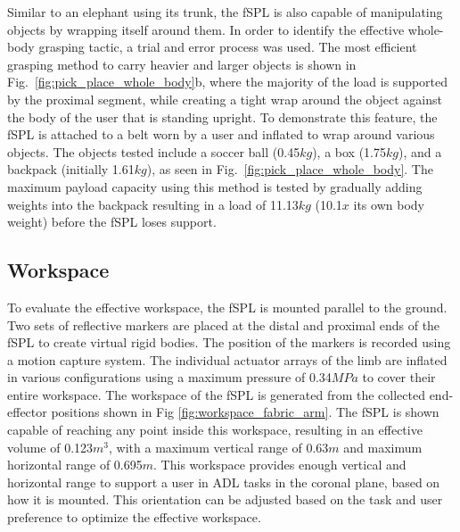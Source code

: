 \documentclass[letterpaper, 10 pt, conference]{ieeeconf}  %
\begin{document}
Similar to an elephant using its trunk, the fSPL is also capable of manipulating objects by wrapping itself around them. In order to identify the effective whole-body grasping tactic, a trial and error process was used. The most efficient grasping method to carry heavier and larger objects is shown in Fig.~\ref{fig:pick_place_whole_body}b, where the majority of the load is supported by the proximal segment, while creating a tight wrap around the object against the body of the user that is standing upright. To demonstrate this feature, the fSPL is attached to a belt worn by a user and inflated to wrap around various objects. The objects tested include a soccer ball (0.45$kg$), a box (1.75$kg$), and a backpack (initially 1.61$kg$), as seen in Fig.~\ref{fig:pick_place_whole_body}. The maximum payload capacity using this method is tested by gradually adding weights into the backpack resulting in a load of 11.13$kg$ (10.1$x$ its own body weight) before the fSPL loses support.
% 
% 
% 
% 



\subsection{Workspace}

To evaluate the effective workspace, the fSPL is mounted parallel to the ground. Two sets of reflective markers are placed at the distal and proximal ends of the fSPL to create virtual rigid bodies. The position of the markers is recorded using a motion capture system. The individual actuator arrays of the limb are inflated in various configurations using a maximum pressure of 0.34$MPa$ to cover their entire workspace. The workspace of the fSPL is generated from the collected end-effector positions shown in Fig \ref{fig:workspace_fabric_arm}. The fSPL is shown capable of reaching any point inside this workspace, resulting in an effective volume of 0.123$m$$^{3}$, with a maximum vertical range of 0.63$m$ and maximum horizontal range of 0.695$m$. This workspace provides enough vertical and horizontal range to support a user in ADL tasks in the coronal plane, based on how it is mounted. This orientation can be adjusted based on the task and user preference to optimize the effective workspace.
\end{document}
